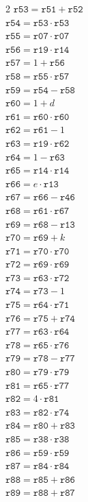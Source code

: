 \documentclass[10pt]{article}
\begin{document}
\begin{multicols}{2}
\(\mathtt{r53} = \mathtt{r51} + \mathtt{r52}\)\\
\(\mathtt{r54} = \mathtt{r53} \cdot \mathtt{r53}\)\\
\(\mathtt{r55} = \mathtt{r07} \cdot \mathtt{r07}\)\\
\(\mathtt{r56} = \mathtt{r19} \cdot \mathtt{r14}\)\\
\(\mathtt{r57} = 1 + \mathtt{r56}\)\\
\(\mathtt{r58} = \mathtt{r55} \cdot \mathtt{r57}\)\\
\(\mathtt{r59} = \mathtt{r54} - \mathtt{r58}\)\\
\(\mathtt{r60} = 1 + d\)\\
\(\mathtt{r61} = \mathtt{r60} \cdot \mathtt{r60}\)\\
\(\mathtt{r62} = \mathtt{r61} - 1\)\\
\(\mathtt{r63} = \mathtt{r19} \cdot \mathtt{r62}\)\\
\(\mathtt{r64} = 1 - \mathtt{r63}\)\\
\(\mathtt{r65} = \mathtt{r14} \cdot \mathtt{r14}\)\\
\(\mathtt{r66} = e \cdot \mathtt{r13}\)\\
\(\mathtt{r67} = \mathtt{r66} - \mathtt{r46}\)\\
\(\mathtt{r68} = \mathtt{r61} \cdot \mathtt{r67}\)\\
\(\mathtt{r69} = \mathtt{r68} - \mathtt{r13}\)\\
\(\mathtt{r70} = \mathtt{r69} + k\)\\
\(\mathtt{r71} = \mathtt{r70} \cdot \mathtt{r70}\)\\
\(\mathtt{r72} = \mathtt{r69} \cdot \mathtt{r69}\)\\
\(\mathtt{r73} = \mathtt{r63} \cdot \mathtt{r72}\)\\
\(\mathtt{r74} = \mathtt{r73} - 1\)\\
\(\mathtt{r75} = \mathtt{r64} \cdot \mathtt{r71}\)\\
\(\mathtt{r76} = \mathtt{r75} + \mathtt{r74}\)\\
\(\mathtt{r77} = \mathtt{r63} \cdot \mathtt{r64}\)\\
\(\mathtt{r78} = \mathtt{r65} \cdot \mathtt{r76}\)\\
\(\mathtt{r79} = \mathtt{r78} - \mathtt{r77}\)\\
\(\mathtt{r80} = \mathtt{r79} \cdot \mathtt{r79}\)\\
\(\mathtt{r81} = \mathtt{r65} \cdot \mathtt{r77}\)\\
\(\mathtt{r82} = 4 \cdot \mathtt{r81}\)\\
\(\mathtt{r83} = \mathtt{r82} \cdot \mathtt{r74}\)\\
\(\mathtt{r84} = \mathtt{r80} + \mathtt{r83}\)\\
\(\mathtt{r85} = \mathtt{r38} \cdot \mathtt{r38}\)\\
\(\mathtt{r86} = \mathtt{r59} \cdot \mathtt{r59}\)\\
\(\mathtt{r87} = \mathtt{r84} \cdot \mathtt{r84}\)\\
\(\mathtt{r88} = \mathtt{r85} + \mathtt{r86}\)\\
\(\mathtt{r89} = \mathtt{r88} + \mathtt{r87}\)\\
\end{multicols}
\end{document}
